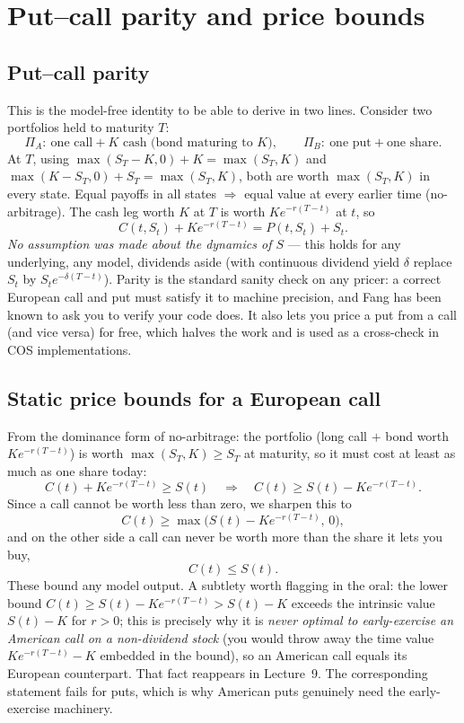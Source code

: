 \documentclass[11pt]{article}
\begin{document}
\section{Put--call parity and price bounds}

\subsection{Put--call parity}

This is the model-free identity to be able to derive in two lines. Consider two portfolios held to maturity $T$:
\[
\Pi_A:\ \text{one call}+K\text{ cash (bond maturing to }K),\qquad
\Pi_B:\ \text{one put}+\text{one share}.
\]
At $T$, using $\max(S_T-K,0)+K=\max(S_T,K)$ and $\max(K-S_T,0)+S_T=\max(S_T,K)$, both are worth $\max(S_T,K)$ in every state. Equal payoffs in all states $\Rightarrow$ equal value at every earlier time (no-arbitrage). The cash leg worth $K$ at $T$ is worth $Ke^{-r(T-t)}$ at $t$, so
\[
\boxed{\,C(t,S_t)+Ke^{-r(T-t)}=P(t,S_t)+S_t.\,}
\]
\emph{No assumption was made about the dynamics of $S$} --- this holds for any underlying, any model, dividends aside (with continuous dividend yield $\delta$ replace $S_t$ by $S_t e^{-\delta(T-t)}$). Parity is the standard sanity check on any pricer: a correct European call and put must satisfy it to machine precision, and Fang has been known to ask you to verify your code does. It also lets you price a put from a call (and vice versa) for free, which halves the work and is used as a cross-check in COS implementations.

\subsection{Static price bounds for a European call}

From the dominance form of no-arbitrage: the portfolio (long call $+$ bond worth $Ke^{-r(T-t)}$) is worth $\max(S_T,K)\ge S_T$ at maturity, so it must cost at least as much as one share today:
\[
C(t)+Ke^{-r(T-t)}\ge S(t)\quad\Longrightarrow\quad C(t)\ge S(t)-Ke^{-r(T-t)}.
\]
Since a call cannot be worth less than zero, we sharpen this to
\[
C(t)\ge \max\!\big(S(t)-Ke^{-r(T-t)},\,0\big),
\]
and on the other side a call can never be worth more than the share it lets you buy,
\[
C(t)\le S(t).
\]
These bound any model output. A subtlety worth flagging in the oral: the lower bound $C(t)\ge S(t)-Ke^{-r(T-t)}> S(t)-K$ exceeds the intrinsic value $S(t)-K$ for $r>0$; this is precisely why it is \emph{never optimal to early-exercise an American call on a non-dividend stock} (you would throw away the time value $Ke^{-r(T-t)}\!-\!K$ embedded in the bound), so an American call equals its European counterpart. That fact reappears in Lecture~9. The corresponding statement fails for puts, which is why American puts genuinely need the early-exercise machinery.
\end{document}
